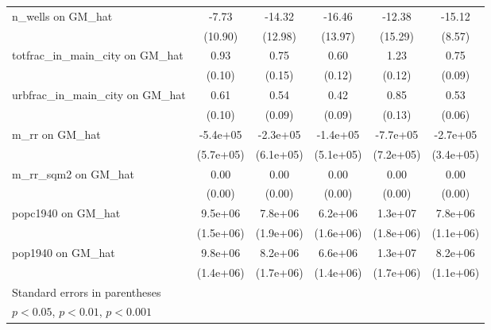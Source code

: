 \begin{table}[htbp]
\begin{tabular}{l*{5}{c}}
\addlinespace
n\_wells on GM\_hat&    -7.73         &   -14.32         &   -16.46         &   -12.38         &   -15.12         \\
                &  (10.90)         &  (12.98)         &  (13.97)         &  (15.29)         &   (8.57)         \\
\addlinespace
totfrac\_in\_main\_city on GM\_hat&     0.93\sym{***}&     0.75\sym{***}&     0.60\sym{***}&     1.23\sym{***}&     0.75\sym{***}\\
                &   (0.10)         &   (0.15)         &   (0.12)         &   (0.12)         &   (0.09)         \\
\addlinespace
urbfrac\_in\_main\_city on GM\_hat&     0.61\sym{***}&     0.54\sym{***}&     0.42\sym{***}&     0.85\sym{***}&     0.53\sym{***}\\
                &   (0.10)         &   (0.09)         &   (0.09)         &   (0.13)         &   (0.06)         \\
\addlinespace
m\_rr on GM\_hat  & -5.4e+05         & -2.3e+05         & -1.4e+05         & -7.7e+05         & -2.7e+05         \\
                &(5.7e+05)         &(6.1e+05)         &(5.1e+05)         &(7.2e+05)         &(3.4e+05)         \\
\addlinespace
m\_rr\_sqm2 on GM\_hat&     0.00\sym{***}&     0.00\sym{**} &     0.00\sym{**} &     0.00\sym{**} &     0.00\sym{***}\\
                &   (0.00)         &   (0.00)         &   (0.00)         &   (0.00)         &   (0.00)         \\
\addlinespace
popc1940 on GM\_hat&  9.5e+06\sym{***}&  7.8e+06\sym{***}&  6.2e+06\sym{***}&  1.3e+07\sym{***}&  7.8e+06\sym{***}\\
                &(1.5e+06)         &(1.9e+06)         &(1.6e+06)         &(1.8e+06)         &(1.1e+06)         \\
\addlinespace
pop1940 on GM\_hat&  9.8e+06\sym{***}&  8.2e+06\sym{***}&  6.6e+06\sym{***}&  1.3e+07\sym{***}&  8.2e+06\sym{***}\\
                &(1.4e+06)         &(1.7e+06)         &(1.4e+06)         &(1.7e+06)         &(1.1e+06)         \\
\bottomrule
\multicolumn{6}{l}{\footnotesize Standard errors in parentheses}\\
\multicolumn{6}{l}{\footnotesize \sym{*} \(p<0.05\), \sym{**} \(p<0.01\), \sym{***} \(p<0.001\)}\\
\end{tabular}
\end{table}
